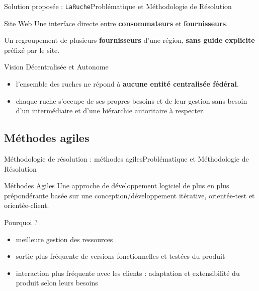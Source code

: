 \documentclass[usenames,dvipsnames]{beamer}
\begin{document}
\begin{frame}{Solution proposée : \texttt{LaRuche}}{Problématique et Méthodologie de Résolution}
\begin{block}{Site Web}
Une interface directe entre \textbf{consommateurs} et \textbf{fournisseurs}.
\end{block}

\begin{definition}[Ruche]
Un regroupement de plusieurs \textbf{fournisseurs} d'une région, \textbf{sans guide explicite} préfixé par le site.
\end{definition}

\begin{block}{Vision Décentralisée et Autonome}
\begin{itemize}
  \item l'ensemble des ruches ne répond à \textbf{aucune entité centralisée fédéral}.
  \item chaque ruche s'occupe de ses propres besoins et de leur gestion sans besoin d'un intermédiaire et d'une hiérarchie autoritaire à respecter.
\end{itemize}
\end{block}
\end{frame}

\subsection{Méthodes agiles}
\begin{frame}{Méthodologie de résolution : méthodes agiles}{Problématique et Méthodologie de Résolution}
\begin{block}{Méthodes Agiles}
Une approche de développement logiciel de plus en plus prépondérante basée sur une conception/développement itérative, orientée-test et orientée-client.
\end{block}

\begin{block}{Pourquoi ?}
\begin{itemize}
  \item meilleure gestion des ressources
  \item sortie plus fréquente de versions fonctionnelles et testées du produit
  \item interaction plus fréquente avec les clients : adaptation et extensibilité du produit selon leurs besoins
\end{itemize}
\end{block}
\end{frame}
\end{document}
